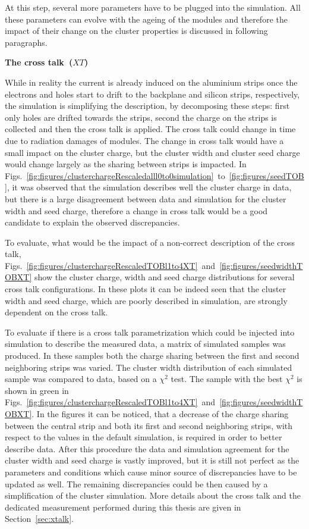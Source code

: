 At this step, several more parameters have to be plugged into the simulation. All these parameters can evolve with the ageing of the modules and therefore the impact of their change on the cluster properties is discussed in following paragraphs. 

\textbf{The cross talk~($XT$)}

While in reality the current is already induced on the aluminium strips once the electrons and holes start to drift to the backplane and silicon strips, respectively, the simulation is simplifying the description, by decomposing these steps: first only holes are drifted towards the strips, second the charge on the strips is collected and then the cross talk is applied. The cross talk could change in time due to radiation damages of modules. The change in cross talk would have a small impact on the cluster charge, but the cluster width and cluster seed charge would change largely as the sharing between strips is impacted. In Figs.~\ref{fig:figures/clusterchargeRescaledalll0to0simulation}~to~\ref{fig:figures/seedTOB}, it was observed that the simulation describes well the cluster charge in data, but there is a large disagreement between data and simulation for the cluster width and seed charge, therefore a change in cross talk would be a good candidate to explain the observed discrepancies.  

To evaluate, what would be the impact of a non-correct description of the cross talk, Figs.~\ref{fig:figures/clusterchargeRescaledTOBl1to4XT}~and~\ref{fig:figures/seedwidthTOBXT} show the cluster charge, width and seed charge distributions for several cross talk configurations. In these plots it can be indeed seen that the cluster width and seed charge, which are poorly described in simulation, are strongly dependent on the cross talk. 

To evaluate if there is a cross talk parametrization which could be injected into simulation to describe the measured data, a matrix of simulated samples was produced. In these samples both the charge sharing between the first and second neighboring strips was varied. The cluster width distribution of each simulated sample was compared to data, based on a $\chi^{2}$ test. The sample with the best $\chi^{2}$ is shown in green in Figs.~\ref{fig:figures/clusterchargeRescaledTOBl1to4XT}~and~\ref{fig:figures/seedwidthTOBXT}. In the figures it can be noticed, that a decrease of the charge sharing between the central strip and both its first and second neighboring strips, with respect to the values in the default simulation, is required in order to better describe data. After this procedure the data and simulation agreement for the cluster width and seed charge is vastly improved, but it is still not perfect as the parameters and conditions which cause minor source of discrepancies have to be updated as well. The remaining discrepancies could be then caused by a simplification of the cluster simulation. More details about the cross talk and the dedicated measurement performed during this thesis are given in Section~\ref{sec:xtalk}.


